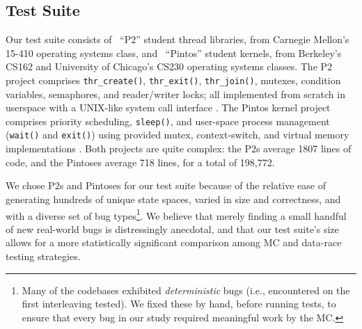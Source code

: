 
\subsection{Test Suite}
\label{sec:testsuite}
Our test suite consists of \numthrlibs~``P2'' student thread libraries, from Carnegie Mellon's 15-410 operating systems class,
and \numpintoses~``Pintos'' student kernels, from Berkeley's CS162 and University of Chicago's
CS230 operating systems classes.
%
The P2 project comprises \texttt{thr\_create()}, \texttt{thr\_exit()}, \texttt{thr\_join()}, mutexes, condition variables, semaphores, and reader/writer locks;
all implemented from scratch in userspace with a UNIX-like system call interface \cite{kspec,thrlib}.
%
The Pintos kernel project
comprises priority scheduling, \texttt{sleep()}, and user-space process management (\texttt{wait()} and \texttt{exit()})
using provided mutex, context-switch, and virtual memory implementations
\cite{pintos}.
Both projects are quite complex:
the P2s average 1807 lines of code, %
and the Pintoses average 718 lines, for a total of 198,772.

We chose P2s and Pintoses for our test suite because of the relative ease of generating hundreds of unique state spaces,
varied in size and correctness, and with a diverse set of bug types\footnote{
Many of the codebases exhibited {\em deterministic} bugs (i.e., encountered on the first interleaving tested).
We fixed these by hand, before running tests, to ensure that every bug in our study required meaningful work by the MC.}.
We believe that merely finding a small handful of new real-world bugs is distressingly anecdotal,
and that our test suite's size allows for a more statistically significant comparison among MC and data-race testing strategies.

